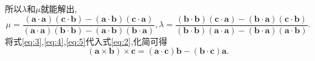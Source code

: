 \documentclass[a4paper]{article}
\begin{document}
所以$\lambda$和$\mu$就能解出,
\begin{equation}\label{eq:5}
\mu=\frac{\mathbf{(a\cdot a)(\mathbf{c}\cdot
    \mathbf{b})-(\mathbf{a}\cdot \mathbf{b})(\mathbf{c}\cdot
    \mathbf{a})}}{\mathbf{(\mathbf{a}\cdot \mathbf{a})(\mathbf{b}\cdot
  \mathbf{b})-(\mathbf{a}\cdot \mathbf{b})(\mathbf{b}\cdot \mathbf{a})}},\lambda=\frac{\mathbf{(b\cdot b)(\mathbf{c}\cdot
    \mathbf{a})-(\mathbf{b}\cdot \mathbf{a})(\mathbf{c}\cdot
    \mathbf{b})}}{\mathbf{(\mathbf{b}\cdot \mathbf{b})(\mathbf{a}\cdot
  \mathbf{a})-(\mathbf{b}\cdot \mathbf{a})(\mathbf{a}\cdot \mathbf{b})}}.
\end{equation}
将式\eqref{eq:3},\eqref{eq:4},\eqref{eq:5}代入式\eqref{eq:2},化简可得
$$
(\mathbf{a}\times \mathbf{b})\times \mathbf{c}=(\mathbf{a}\cdot
\mathbf{c})\mathbf{b}-(\mathbf{b}\cdot \mathbf{c})\mathbf{a}.
$$
\end{document}
